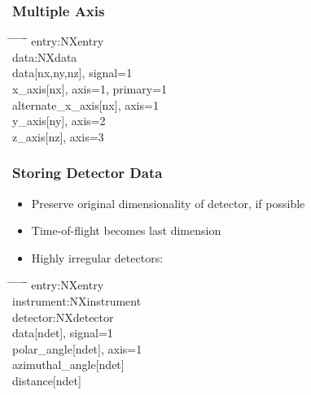 \documentclass{beamer}
\begin{document}
\begin{frame} \frametitle{Multiple Axis}
\begin{tabbing}
\hspace*{1cm} \= \hspace*{1cm} \= \hspace*{1cm} \= \hspace*{1cm} \= \hspace*{1cm} \= \hspace*{1cm}\= \kill
entry:NXentry \\
 \>data:NXdata\\
 \> \> data[nx,ny,nz], signal=1\\
 \> \> x\_axis[nx], axis=1, primary=1\\
 \> \> alternate\_x\_axis[nx], axis=1\\
 \> \> y\_axis[ny], axis=2\\
 \> \> z\_axis[nz], axis=3\\
\end{tabbing}
\end{frame}



\begin{frame}
\frametitle{Storing Detector Data}
\begin{itemize}
\item Preserve original dimensionality of detector, if possible
\item Time-of-flight becomes last dimension
\item Highly irregular detectors:
\end{itemize}
\begin{tabbing}
\hspace*{1cm} \= \hspace*{1cm} \= \hspace*{1cm} \= \hspace*{1cm} \= \hspace*{1cm} \= \hspace*{1cm}\= \kill
entry:NXentry \\
\>instrument:NXinstrument\\
\> \>detector:NXdetector\\
\>  \> \> data[ndet], signal=1\\
\> \> \> polar\_angle[ndet], axis=1\\
\> \> \> azimuthal\_angle[ndet]\\
\> \> \> distance[ndet]\\
\end{tabbing}
\end{frame}
\end{document}
